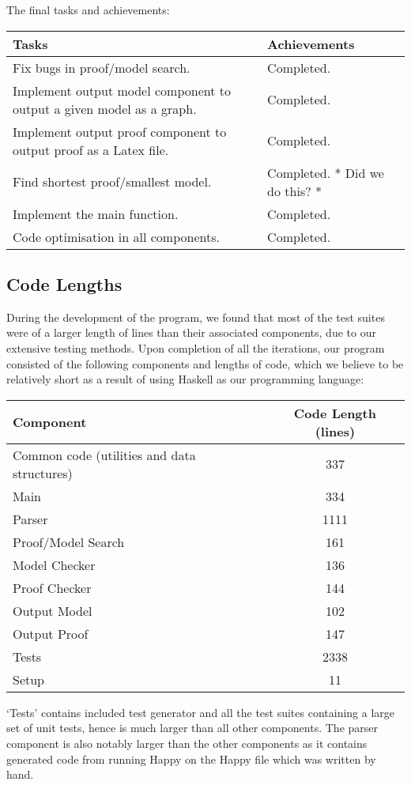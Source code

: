The final tasks and achievements:

\begin{center}
\begin{longtable}{| p{7cm} | p{8cm} |}
\hline
\textbf{Tasks} & \textbf{Achievements} \\
\hline
Fix bugs in proof/model search. & Completed.\\
\hline
Implement output model component to output a given model as a graph. & Completed.\\
\hline
Implement output proof component to output proof as a Latex file. & Completed.\\
\hline
Find shortest proof/smallest model. & Completed. * Did we do this? *\\
\hline
Implement the main function. & Completed.\\
\hline
Code optimisation in all components. & Completed.\\
\hline
\end{longtable}
\end{center}

\subsection{Code Lengths}

During the development of the program, we found that most of the test suites were of a larger length of lines than their associated components, due to our extensive testing methods. Upon completion of all the iterations, our program consisted of the following components and lengths of code, which we believe to be relatively short as a result of using Haskell as our programming language:

\begin{center}
  \begin{tabular}{|l|c|}
\hline
\textbf{Component} & \textbf{Code Length (lines)} \\
\hline
Common code (utilities and data structures) & 337\\
\hline
Main & 334\\
\hline
Parser & 1111\\
\hline
Proof/Model Search & 161\\
\hline
Model Checker & 136\\
\hline
Proof Checker & 144\\
\hline
Output Model & 102\\
\hline
Output Proof & 147\\
\hline
Tests & 2338\\
\hline
Setup & 11\\
\hline
\end{tabular}
\end{center}

`Tests' contains included test generator and all the test suites containing a large set of unit tests, hence is much larger than all other components. The parser component is also notably larger than the other components as it contains generated code from running Happy on the Happy file which was written by hand.
